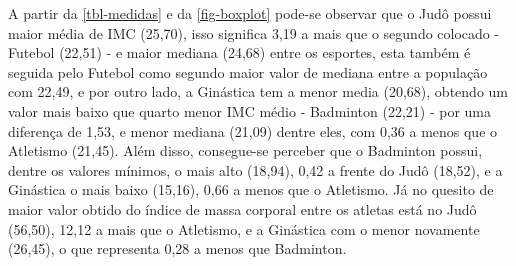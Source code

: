 \documentclass[
]{estat/estat}
\begin{document}
\begin{table}[H]

\caption{\label{tbl-medidas}Medidas resumo do IMC por esportes}


\end{table}%

A partir da \ref{tbl-medidas} e da \ref{fig-boxplot} pode-se observar
que o Judô possui maior média de IMC (25,70), isso significa 3,19 a mais
que o segundo colocado - Futebol (22,51) - e maior mediana (24,68) entre
os esportes, esta também é seguida pelo Futebol como segundo maior valor
de mediana entre a população com 22,49, e por outro lado, a Ginástica
tem a menor media (20,68), obtendo um valor mais baixo que quarto menor
IMC médio - Badminton (22,21) - por uma diferença de 1,53, e menor
mediana (21,09) dentre eles, com 0,36 a menos que o Atletismo (21,45).
Além disso, consegue-se perceber que o Badminton possui, dentre os
valores mínimos, o mais alto (18,94), 0,42 a frente do Judô (18,52), e a
Ginástica o mais baixo (15,16), 0,66 a menos que o Atletismo. Já no
quesito de maior valor obtido do índice de massa corporal entre os
atletas está no Judô (56,50), 12,12 a mais que o Atletismo, e a
Ginástica com o menor novamente (26,45), o que representa 0,28 a menos
que Badminton.
\end{document}
